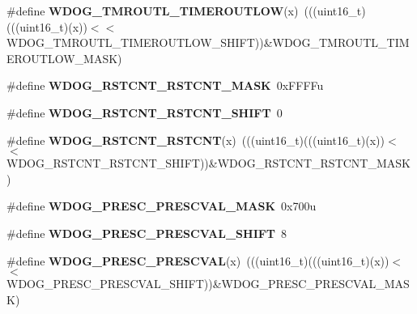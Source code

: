\begin{DoxyCompactItemize}
\item 
\#define {\bfseries W\+D\+O\+G\+\_\+\+T\+M\+R\+O\+U\+T\+L\+\_\+\+T\+I\+M\+E\+R\+O\+U\+T\+L\+OW}(x)~(((uint16\+\_\+t)(((uint16\+\_\+t)(x))$<$$<$W\+D\+O\+G\+\_\+\+T\+M\+R\+O\+U\+T\+L\+\_\+\+T\+I\+M\+E\+R\+O\+U\+T\+L\+O\+W\+\_\+\+S\+H\+I\+FT))\&W\+D\+O\+G\+\_\+\+T\+M\+R\+O\+U\+T\+L\+\_\+\+T\+I\+M\+E\+R\+O\+U\+T\+L\+O\+W\+\_\+\+M\+A\+SK)\hypertarget{group__WDOG__Register__Masks_gac3d8acaa47ae35b724e29dcd0ed62ac3}{}\label{group__WDOG__Register__Masks_gac3d8acaa47ae35b724e29dcd0ed62ac3}

\item 
\#define {\bfseries W\+D\+O\+G\+\_\+\+R\+S\+T\+C\+N\+T\+\_\+\+R\+S\+T\+C\+N\+T\+\_\+\+M\+A\+SK}~0x\+F\+F\+F\+Fu\hypertarget{group__WDOG__Register__Masks_ga1cb55a509947b315d216ed9d822a4967}{}\label{group__WDOG__Register__Masks_ga1cb55a509947b315d216ed9d822a4967}

\item 
\#define {\bfseries W\+D\+O\+G\+\_\+\+R\+S\+T\+C\+N\+T\+\_\+\+R\+S\+T\+C\+N\+T\+\_\+\+S\+H\+I\+FT}~0\hypertarget{group__WDOG__Register__Masks_gaf2ecbd74ca7b1ba60bc7b89de17b97a6}{}\label{group__WDOG__Register__Masks_gaf2ecbd74ca7b1ba60bc7b89de17b97a6}

\item 
\#define {\bfseries W\+D\+O\+G\+\_\+\+R\+S\+T\+C\+N\+T\+\_\+\+R\+S\+T\+C\+NT}(x)~(((uint16\+\_\+t)(((uint16\+\_\+t)(x))$<$$<$W\+D\+O\+G\+\_\+\+R\+S\+T\+C\+N\+T\+\_\+\+R\+S\+T\+C\+N\+T\+\_\+\+S\+H\+I\+FT))\&W\+D\+O\+G\+\_\+\+R\+S\+T\+C\+N\+T\+\_\+\+R\+S\+T\+C\+N\+T\+\_\+\+M\+A\+SK)\hypertarget{group__WDOG__Register__Masks_ga7ca7ac27fe2491ac993344daf567aadf}{}\label{group__WDOG__Register__Masks_ga7ca7ac27fe2491ac993344daf567aadf}

\item 
\#define {\bfseries W\+D\+O\+G\+\_\+\+P\+R\+E\+S\+C\+\_\+\+P\+R\+E\+S\+C\+V\+A\+L\+\_\+\+M\+A\+SK}~0x700u\hypertarget{group__WDOG__Register__Masks_gaeadae4c65653a3302e69526730af1596}{}\label{group__WDOG__Register__Masks_gaeadae4c65653a3302e69526730af1596}

\item 
\#define {\bfseries W\+D\+O\+G\+\_\+\+P\+R\+E\+S\+C\+\_\+\+P\+R\+E\+S\+C\+V\+A\+L\+\_\+\+S\+H\+I\+FT}~8\hypertarget{group__WDOG__Register__Masks_gaa93b6acb20a8e20b687f05b8ced452c1}{}\label{group__WDOG__Register__Masks_gaa93b6acb20a8e20b687f05b8ced452c1}

\item 
\#define {\bfseries W\+D\+O\+G\+\_\+\+P\+R\+E\+S\+C\+\_\+\+P\+R\+E\+S\+C\+V\+AL}(x)~(((uint16\+\_\+t)(((uint16\+\_\+t)(x))$<$$<$W\+D\+O\+G\+\_\+\+P\+R\+E\+S\+C\+\_\+\+P\+R\+E\+S\+C\+V\+A\+L\+\_\+\+S\+H\+I\+FT))\&W\+D\+O\+G\+\_\+\+P\+R\+E\+S\+C\+\_\+\+P\+R\+E\+S\+C\+V\+A\+L\+\_\+\+M\+A\+SK)\hypertarget{group__WDOG__Register__Masks_ga13265fa90a567f7d142cd9cf3a5c0118}{}\label{group__WDOG__Register__Masks_ga13265fa90a567f7d142cd9cf3a5c0118}


\end{DoxyCompactItemize}
